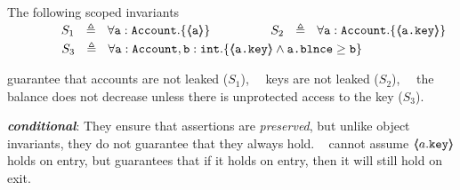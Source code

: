 \begin{example}
\label{s:bankSpecEx}
The following scoped invariants\\
$\strut \SPSP\ \ \   S_1\ \  \triangleq \ \ \TwoStatesN {\prg{a}:\prg{Account}}  {\inside{\prg{a}}} $ 
\hspace{1.1cm}
$\strut  \SPSP\ \ \   S_2\ \  \triangleq \ \ \TwoStatesN  {\prg{a}:\prg{Account}}  {\inside{\prg{a.key}}} $ 
\\
$\strut  \SPSP\ \ \   S_3\ \  \triangleq \ \ \TwoStatesN{ \prg{a}:\prg{Account},\prg{b}:\prg{int} } {\inside{\prg{a.key}} \wedge \prg{a.\balance} \geq \prg{b} } $ 

\noindent
 guarantee that   accounts are not leaked  ($S_1$), \ \ keys are not leaked  ($S_2$), \ \ the balance does not decrease unless there is unprotected access to the key  ($S_3$).
%
\end{example} 


 
 \vspace{.05cm}

 
\noindent
{\textbf{ \emph{conditional}}:}  They ensure that assertions are \emph{preserved}, but unlike object invariants, they do not guarantee that they always hold.
\ \Eg   {} cannot assume $\langle\!\!\langle a.\mbox{\normalfont{\texttt{key}}} \rangle\!\!\rangle$ holds on entry, but   guarantees that if it holds on entry, then  it will still hold on exit.

